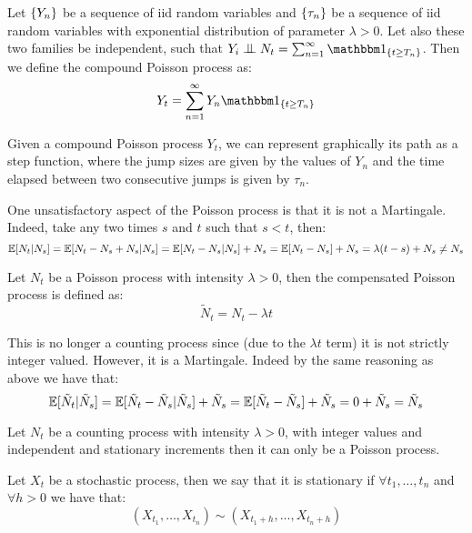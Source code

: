 \begin{definition}
    Let $\{ Y_n \}$ be a sequence of iid random variables and $\{ \tau_n \}$ be a
    sequence of iid random variables with exponential distribution of parameter
    $\lambda > 0$. Let also these two families be independent, such that
    $Y_i \indep N_t = \sum^\infty_{n=1} \I_{\{t\geq T_n\}}$. Then we define the
    compound Poisson process as:
    \[
        Y_t = \sum^\infty_{n=1} Y_n \I_{\{t\geq T_n\}}
    \]
\end{definition}

Given a compound Poisson process $Y_t$, we can represent graphically its path
as a step function, where the jump sizes are given by the values of $Y_n$ and
the time elapsed between two consecutive jumps is given by $\tau_n$.


One unsatisfactory aspect of the Poisson process is that it is not
a Martingale. Indeed, take any two times $s$ and $t$ such that $s<t$, then:
\[
    \mathbb{E}[N_t | N_s] = \mathbb{E}[N_t - N_s + N_s | N_s] = \mathbb{E}[N_t - N_s | N_s] + N_s
    = \mathbb{E}[N_t - N_s] + N_s = \lambda(t-s) + N_s \neq N_s
\]

\begin{definition}
    Let $N_t$ be a Poisson process with intensity $\lambda > 0$, then the
    compensated Poisson process is defined as:
    \[
        \tilde{N}_t = N_t - \lambda t
    \]
\end{definition}

This is no longer a counting process since (due to the $\lambda t$ term) it is
not strictly integer valued. However, it is a Martingale. Indeed by the same
reasoning as above we have that:
\[
    \mathbb{E}[\tilde{N}_t | \tilde{N}_s] = \mathbb{E}[\tilde{N}_t - \tilde{N}_s | \tilde{N}_s]
    + \tilde{N}_s = \mathbb{E}[\tilde{N}_t - \tilde{N}_s] + \tilde{N}_s = 0 + \tilde{N}_s
    = \tilde{N}_s
\]

\begin{theorem}
    Let $N_t$ be a counting process with intensity $\lambda > 0$, with integer
    values and independent and stationary increments then it can only be a
    Poisson process. 
\end{theorem}

\begin{definition}[Stationary]
    Let $X_t$ be a stochastic process, then we say that it is stationary if
    $\forall t_1,\ldots,t_n$ and $\forall h > 0$ we have that:
    \[
        (X_{t_1},\ldots,X_{t_n}) \sim (X_{t_1+h},\ldots,X_{t_n+h})
    \]
\end{definition}

